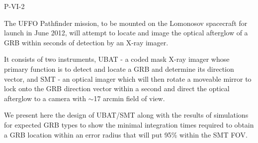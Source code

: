 P-VI-2


\bigskip



\bigskip

\noindent The UFFO Pathfinder mission, to be mounted on the Lomonosov spacecraft for launch in June 2012, will attempt to locate and image the optical afterglow of a GRB within seconds of detection by an X-ray imager.

It consists of two instruments, UBAT - a coded mask X-ray imager whose primary function is to detect and locate a GRB and determine its direction vector, and SMT - an optical imager which will then rotate a moveable mirror to lock onto the GRB direction vector within a second and direct the optical afterglow to a camera with $\sim$17 arcmin field of view.

We present here the design of UBAT/SMT along with the results of simulations for expected GRB types to show the minimal integration times required to obtain a GRB location within an error radius that will put 95\% within the SMT FOV.

